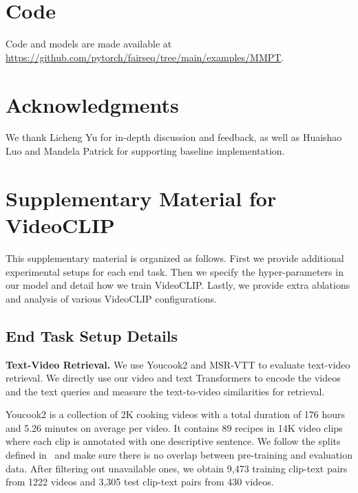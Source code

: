 \documentclass[11pt]{article}
\begin{document}
\vspace{5pt}
\section*{Code}

Code and models are made available at \url{https://github.com/pytorch/fairseq/tree/main/examples/MMPT}.

\vspace{5pt}
\section*{Acknowledgments}
We thank Licheng Yu for in-depth discussion and feedback, as well as Huaishao Luo and Mandela Patrick for supporting baseline implementation.











\newpage
\appendix


\section{Supplementary Material for VideoCLIP}
This supplementary material is organized as follows.
First we provide additional experimental setups for each end task. 
Then we specify the hyper-parameters in our model and detail how we train VideoCLIP.
Lastly, we provide extra ablations and analysis of various VideoCLIP configurations.


\subsection{End Task Setup Details}
\noindent \textbf{Text-Video Retrieval.} We use Youcook2 and MSR-VTT to evaluate text-video retrieval. We directly use our video and text Transformers to encode the videos and the text queries and measure the text-to-video similarities for retrieval.

Youcook2 \cite{zhou2017towards} is a collection of 2K cooking videos with a total duration of 176 hours and 5.26 minutes on average per video.
It contains 89 recipes in 14K video clips where each clip is annotated with one descriptive sentence. 
We follow the splits defined in~\citet{miech2019howto100m} and make sure there is no overlap between pre-training and evaluation data. 
After filtering out unavailable ones, we obtain 9,473 training clip-text pairs from 1222 videos and 3,305 test clip-text pairs from 430 videos.
\end{document}
